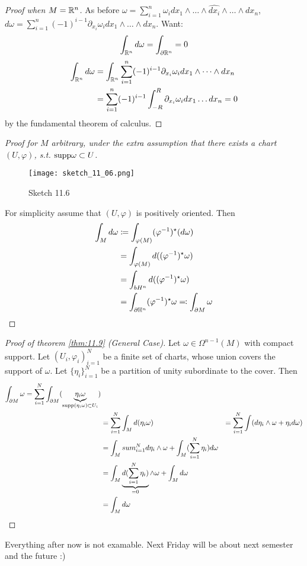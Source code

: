 \begin{proof}[Proof when \(M=\mathbb{R}^n\)]
    As before \(\omega=\sum_{i=1}^n\omega_i dx_1\wedge \dots \wedge \hat{dx_i}\wedge \dots\wedge dx_n\),
    \(d\omega=\sum_{i=1}^n(-1)^{i-1}\partial_{x_i}\omega_i dx_1\wedge \dots \wedge dx_n\). Want:
    \[\int_{\mathbb{R}^n}d\omega=\int_{\partial \mathbb{R}^n}=0\]
    \begin{align*}
        \int_{\mathbb{R}^n} d\omega&=\int_{\mathbb{R}^n} \sum_{i=1}^n(-1)^{i-1}\partial_{x_i}\omega_i dx_1\wedge \dots \wedge dx_n \\
        &=\sum_{i=1}^n(-1)^{i-1}\int_{-R}^R\partial_{x_i}\omega_i dx_1\dots dx_n =0
    \end{align*}
    by the fundamental theorem of calculus.
\end{proof}

\begin{proof}[Proof  for \(M\) arbitrary, under the extra assumption that  there exists a chart \((U,\varphi)\), s.t. 
              \(\text{supp}\omega\subset U\)]
    \begin{figure}[H]\label{fig:11.6}
        \centering
        \texttt{[image: sketch\_11\_06.png]}
        \caption{Sketch 11.6}
    \end{figure}
    For simplicity assume that \((U,\varphi)\) is positively oriented. Then 
    \begin{align*}
        \int_M d\omega&\coloneqq \int_{\varphi(M)}(\varphi^{-1})^\star(d\omega)\\
        &=\int_{\varphi(M)}d((\varphi^{-1})^\star \omega)\\
        &=\int_{bH^n} d((\varphi^{-1})^\star \omega)\\
        &=\int_{\partial \mathbb{H}^n} (\varphi^{-1})^\star \omega\eqqcolon\int_{\partial M} \omega
    \end{align*}
\end{proof}

\begin{proof}[Proof of theorem \ref{thm:11.9} (General Case)]
    Let \(\omega\in \Omega^{n-1}(M)\) with compact support. Let \((U_i,\varphi_i)_{i=1}^N\)
    be a finite set of charts, whose union covers the support of \(\omega\). Let 
    \(\{\eta_i\}_{i=1}^N\) be a partition of unity subordinate to the cover. Then 
    \begin{align*}
        \int_{\partial M}\omega= \sum_{i=1}^N\int_{\partial M} (\underbrace{\eta_i\omega}_{\text{supp}(\eta_i\omega)\subset U_i})\\
        &=\sum_{i=1}^N\int_M d(\eta_i\omega)
        &=\sum_{i=1}^N \int (d\eta_i\wedge \omega+\eta_id\omega)\\
        &=\int_M sum_{i=1}^N d\eta_i\wedge \omega +\int_M (\sum_{i=1}^N \eta_i) d\omega\\
        &=\int_M \underbrace{d(\sum_{i=1}^N \eta_i)}_{=0}\wedge \omega +\int_M d\omega\\
        &=\int_M d\omega \qedhere
    \end{align*}
\end{proof}
Everything after now is not examable. Next Friday will be about next semester and the future :)

